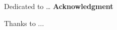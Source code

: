 Dedicated to \dots
\newpage 
\Large{\textbf{Acknowledgment}}
  
  \vspace*{15mm}
  
  \large
  Thanks to ...